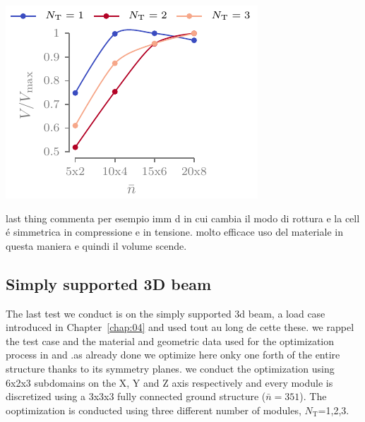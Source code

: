 \begin{marginfigure}
    \centering
    \includegraphics{figures/06_DMO/00_tug_bench_crv2/vol.pdf}
    \caption{}
    \label{fig:06_cant_volume_norm_2}
\end{marginfigure}

last thing commenta per esempio imm d in cui cambia il modo di rottura e la cell é simmetrica in compressione e in tensione. molto efficace uso del materiale in questa maniera e quindi il volume scende.

\subsection{Simply supported 3D beam}
The last test we conduct is on the simply supported 3d beam, a load case introduced in Chapter~\ref{chap:04} and used tout au long de cette these. we rappel the test case and the material and geometric data used for the optimization process in  and .as already done we optimize here onky one forth of the entire structure thanks to its symmetry planes. we conduct the optimization using 6x2x3 subdomains on the X, Y and Z axis respectively and every module is discretized using a 3x3x3 fully connected ground structure ($\bar{n} = 351$). The ooptimization is conducted using three different number of modules, $N_\text{T}$=1,2,3.

